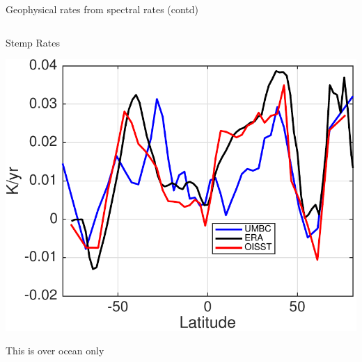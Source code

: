 \documentclass[10pt,t]{beamer}
\begin{document}
\begin{frame}{Geophysical rates from spectral rates (contd)}
\vspace{-0.3in}

\begin{columns}
\begin{column}{0.55\columnwidth}
\begin{block}{\footnotesize Stemp Rates}
\vspace{-0.1in}
\begin{center}
\includegraphics[width=\linewidth]{Figs/CloudAnom/Desc_ocean/stemp_lat_rates_from_obs_specral_rates.pdf}
\end{center}
\footnotesize
This is over ocean only
\end{block}
\end{column}


\end{columns}
\end{frame}
\end{document}
